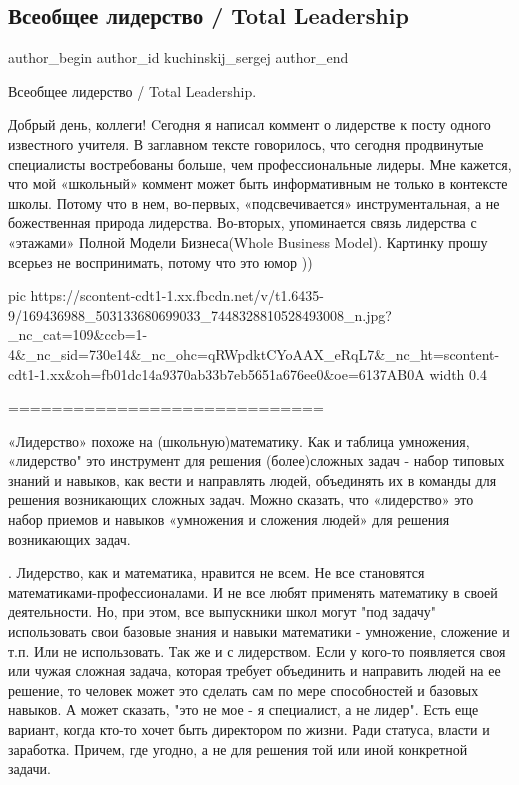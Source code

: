 
 
 
 
 
 
\subsection{Всеобщее лидерство / Total Leadership}
\label{sec:06_04_2021.fb.kuchinskij_sergej.1.liderstvo}
 
\ifcmt
 author_begin
   author_id kuchinskij_sergej
 author_end
\fi

Всеобщее лидерство / Total Leadership. 

Добрый день, коллеги! Cегодня я написал коммент о лидерстве к посту одного
известного учителя. В заглавном тексте говорилось, что сегодня продвинутые
специалисты востребованы больше, чем профессиональные лидеры. Мне кажется, что
мой «школьный» коммент может быть информативным не только в контексте школы.
Потому что в нем, во-первых, «подсвечивается» инструментальная, а не
божественная природа лидерства. Во-вторых, упоминается связь лидерства с
«этажами» Полной Модели Бизнеса(Whole Business Model). Картинку прошу всерьез
не воспринимать, потому что это юмор ))

\ifcmt
  pic https://scontent-cdt1-1.xx.fbcdn.net/v/t1.6435-9/169436988_503133680699033_7448328810528493008_n.jpg?_nc_cat=109&ccb=1-4&_nc_sid=730e14&_nc_ohc=qRWpdktCYoAAX_eRqL7&_nc_ht=scontent-cdt1-1.xx&oh=fb01dc14a9370ab33b7eb5651a676ee0&oe=6137AB0A
  width 0.4
\fi

=============================

«Лидерство» похоже на (школьную)математику. Как и таблица умножения,
«лидерство" это инструмент для решения (более)сложных задач - набор типовых
знаний и навыков, как вести и направлять людей, объединять их в команды для
решения возникающих сложных задач. Можно сказать, что «лидерство» это набор
приемов и навыков «умножения и сложения людей» для решения возникающих задач. 

.
Лидерство, как и математика, нравится не всем. Не все становятся
математиками-профессионалами. И не все любят применять математику в своей
деятельности. Но, при этом, все выпускники школ могут "под задачу" использовать
свои базовые знания и навыки математики - умножение, сложение и т.п. Или не
использовать. Так же и с лидерством. Если у кого-то появляется своя или чужая
сложная задача, которая требует объединить и направить людей на ее решение, то
человек может это сделать сам по мере способностей и базовых навыков. А может
сказать, "это не мое - я специалист, а не лидер". Есть еще вариант, когда
кто-то хочет быть директором по жизни. Ради статуса, власти и заработка.
Причем, где угодно, а не для решения той или иной конкретной задачи. 

